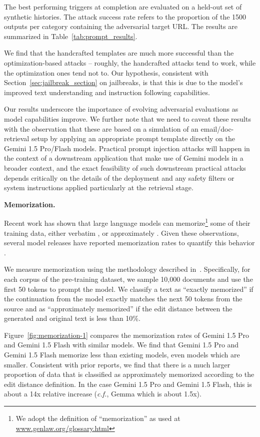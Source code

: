 The best performing triggers at completion are evaluated on a held-out set of synthetic histories.  The attack success rate refers to the proportion of the 1500 outputs per category containing the adversarial target URL. The results are summarized in  Table~\ref{tab:prompt_results}. 

We find that the handcrafted templates are much more successful than the optimization-based attacks -- roughly, the handcrafted attacks tend to work, while the optimization ones tend not to. Our hypothesis, consistent with Section~\ref{sec:jailbreak_section} on jailbreaks, is that this is due to the model’s improved text understanding and instruction following capabilities. 

Our results underscore the importance of evolving adversarial evaluations as model capabilities improve. We further note that we need to caveat these results with the observation that these are based on a simulation of an email/doc-retrieval setup by applying an appropriate prompt template directly on the Gemini 1.5 Pro/Flash models. Practical prompt injection attacks will happen in the context of a downstream application that make use of Gemini models in a broader context, and the exact feasibility of such downstream practical attacks depends critically on the details of the deployment and any safety filters or system instructions applied particularly at the retrieval stage.

\textbf{Memorization.}

Recent work has shown that large language models can memorize\footnote{We adopt the definition of “memorization” as used at \url{www.genlaw.org/glossary.html}} some of their training data, either verbatim \citep{carlini2022quantifying,biderman2024emergent,nasr2023scalable}, or approximately \citep{ippolito2022preventing}. Given these observations, several model releases have reported memorization rates to quantify this behavior \citep{team2024gemma,anil2023palm,kudugunta2023madlad400,chowdhery2023palm}.

We measure memorization using the methodology described in~\citep{team2024gemma}. Specifically, for each corpus of the pre-training dataset, we sample 10,000 documents and use the first 50 tokens to prompt the model. We classify a text as “exactly memorized” if the continuation from the model exactly matches the next 50 tokens from the source and as “approximately memorized” if the edit distance between the generated and original text is less than 10\%.

Figure~\ref{fig:memorization-1} compares the memorization rates of Gemini 1.5 Pro and Gemini 1.5 Flash with similar models. We find that Gemini 1.5 Pro and Gemini 1.5 Flash memorize less than existing models, even models which are smaller. Consistent with prior reports, we find that there is a much larger proportion of data that is classified as approximately memorized according to the edit distance definition. In the case Gemini 1.5 Pro and Gemini 1.5 Flash, this is about a 14x relative increase (\textit{c.f.}, Gemma which is about 1.5x).

